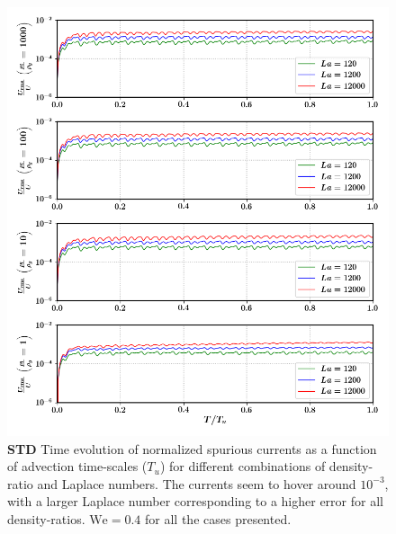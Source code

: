 \begin{figure}[h!]
    \centering
    \includegraphics[]{plots/droplet_advect/evo_nonmc.png}
	\caption{\textbf{STD} Time evolution of normalized spurious currents as a function of advection time-scales ($T_u$) for different combinations of density-ratio and Laplace numbers. The currents seem to hover around $10^{-3}$, with a larger Laplace number corresponding to a higher error for all density-ratios. $\textrm{We} = 0.4$ for all the cases presented.}   
    \label{evo_nonmc}
\end{figure}


